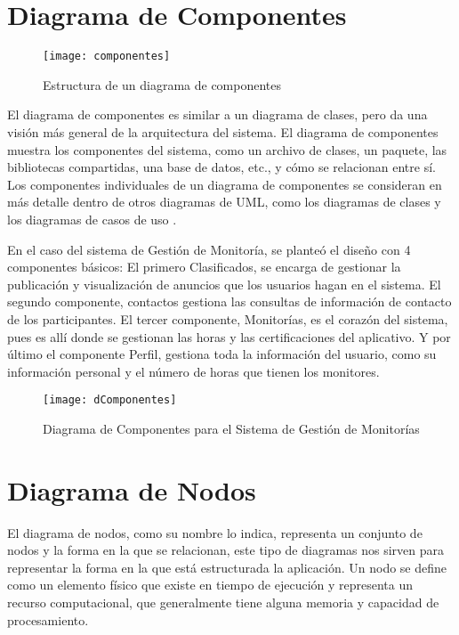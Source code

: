 \newpage

\section{Diagrama de Componentes}
\begin{figure}[H]
	\centering
	\texttt{[image: componentes]}
	\centering
	\caption{Estructura de un diagrama de componentes}
	\label{fig:componentes}
\end{figure}

El diagrama de componentes es similar a un diagrama de clases, pero da una visión más
general de la arquitectura del sistema. El diagrama de componentes muestra los componentes
del sistema, como un archivo de clases, un paquete, las bibliotecas compartidas, una base
de datos, etc., y cómo se relacionan entre sí. Los componentes individuales de un diagrama de
componentes se consideran en más detalle dentro de otros diagramas de UML, como los
diagramas de clases y los diagramas de casos de uso \cite{Kendall_2005}.

En el caso del sistema de Gestión de Monitoría, se planteó el diseño con 4 componentes básicos: El primero Clasificados, se encarga de gestionar la publicación y visualización de anuncios que los usuarios hagan en el sistema. El segundo componente, contactos gestiona las consultas de información de contacto de los participantes. El tercer componente, Monitorías, es el corazón del sistema, pues es allí donde se gestionan las horas y las certificaciones del aplicativo. Y por último el componente Perfil, gestiona toda la información del usuario, como su información personal y el número de horas que tienen los monitores.

\begin{figure}[H]
	\centering
	\texttt{[image: dComponentes]}
	\centering
	\caption{Diagrama de Componentes para el Sistema de Gestión de Monitorías}
	\label{fig:dcomponentes}
\end{figure}
\newpage


\section{Diagrama de Nodos}
El diagrama de nodos, como su nombre lo indica, representa un conjunto de nodos y la forma en la que se relacionan, este tipo de diagramas nos sirven para representar la forma en la que está estructurada la aplicación. Un nodo se define como un elemento físico que existe en tiempo de ejecución y representa un recurso computacional, que generalmente tiene alguna memoria y capacidad de procesamiento\cite{Nodos}.

